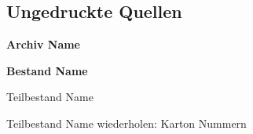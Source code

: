 

\subsection{Ungedruckte Quellen}

\newcommand{\varhspace}{\hspace{0.5cm}}

\textbf{\large{Archiv Name}}

\noindent
\textbf{Bestand Name}

\noindent
Teilbestand Name

\varhspace Teilbestand Name wiederholen: Karton Nummern
\bigskip
\noindent
